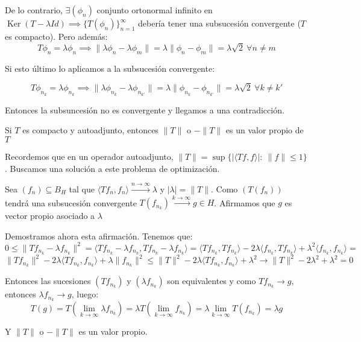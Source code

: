\documentclass[openany]{book}
\begin{document}
\begin{demonstration}
    De lo contrario, $ \exists (\phi_n)$ conjunto ortonormal infinito en $ \operatorname{Ker}(T- \lambda Id) \implies \{T(\phi_n)\}_{n=1}^{\infty}$ debería tener una subsucesión convergente ($ T$ es compacto). Pero además:
    $$ T \phi_n = \lambda  \phi_n \implies \|\lambda  \phi_n - \lambda \phi_m\| = \lambda  \| \phi_n-\phi_m\| = \lambda  \sqrt{2} \ \forall n \ne m $$
    
    Si esto último lo aplicamos a la subsucesión convergente:
    
    $$ T \phi_{n_k} = \lambda  \phi_{n_k} \implies \|\lambda  \phi_{n_k} - \lambda \phi_{n_{k'}}\| = \lambda  \| \phi_{n_k}-\phi_{n_{k'}}\| = \lambda  \sqrt{2} \ \forall k \ne k' $$

    Entonces la subsuncesión no es convergente y llegamos a una contradicción.
\end{demonstration}

\begin{proposition}
    Si $ T$ es compacto y autoadjunto, entonces $ \|T\|$ o $ -\|T\|$ es un valor propio de $ T$
\end{proposition}

\begin{demonstration}
    Recordemos que en un operador autoadjunto, $ \|T\| = \sup \{|\langle Tf, f \rangle|:\ \|f\| \leq  1\} $. Buscamos una solución a este problema de optimización.

    Sea $ (f_n) \subseteq  B_{H}$ tal que $ \langle Tf_n, f_n \rangle \xrightarrow{n \to \infty} \lambda $ y $ |\lambda | = \|T\|$. Como $ (T(f_n))$ tendrá una subsucesión convergente $ T(f_{n_{k}}) \xrightarrow{k \to \infty}g \in H$. Afirmamos que $ g$ es vector propio asociado a $ \lambda $

    Demostramos ahora esta afirmación. Tenemos que:
    $$ 0\leq  \|Tf_{n_{k}} - \lambda  f_{n_{k}}\|^2 = \langle Tf_{n_{k}} - \lambda f_{n_{k}}, Tf_{n_{k}} - \lambda f_{n_{k}} \rangle = \langle Tf_{n_{k}}, Tf_{n_{k}} \rangle -2 \lambda \langle f_{n_{k}}, Tf_{n_{k}} \rangle + \lambda ^2 \langle f_{n_{k}}, f_{n_{k}} \rangle= $$  
    $$ \|Tf_{n_{k}}\|^2 - 2\lambda \langle Tf_{n_{k}}, f_{n_{k}} \rangle + \lambda \|f_{n_{k}}\|^2 \leq  \|T\|^2 -2 \lambda \langle Tf_{n_{k}}, f_{n_{k}} \rangle + \lambda ^2 \to \|T\|^2 -2 \lambda^2 + \lambda^2  = 0$$

    Entonces las sucesiones $ (Tf_{n_{k}})$ y $ (\lambda f_{n_{k}})$ son equivalentes y como $ Tf_{n_{k}} \to g$, entonces $ \lambda f_{n_{k}} \to g$, luego:
    $$ T(g) = T(\lim_{k \to \infty} \lambda f_{n_{k}}) = \lambda T  \left(\lim_{k \to \infty} f_{n_{k}} \right) = \lambda \lim_{k \to \infty} T(f_{n_{k}}) = \lambda g $$

    Y $ \|T\|$ o $ -\|T\|$ es un valor propio.
\end{demonstration}
\end{document}
